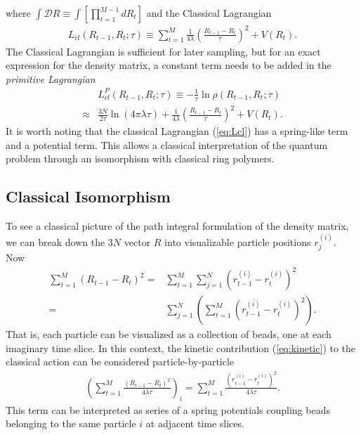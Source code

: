 \documentclass[prl,reprint]{revtex4-1}
\begin{document}
where $\int \mathcal{D}R\equiv \int[\prod_{t=1}^{M-1} dR_t]$ and the Classical Lagrangian~\cite{Ceperley_PIMC-review,Julich}
\begin{align}
L_{cl}(R_{t-1},R_t;\tau) \equiv \sum_{t=1}^M \frac{1}{4\lambda}\left(\frac{R_{t-1}-R_t}{\tau}\right)^2+V(R_t). \label{eq:Lcl}
\end{align}
The Classical Lagrangian is sufficient for later sampling, but for an exact expression for the density matrix, a constant term needs to be added in the \emph{primitive Lagrangian}
\begin{align}
&L^P_{cl}(R_{t-1},R_t;\tau)\equiv -\frac{1}{\tau}\ln\rho(R_{t-1},R_t;\tau) \nonumber \\
\approx&\frac{3N}{2\tau}\ln(4\pi\lambda\tau)+\frac{1}{4\lambda}\left(\frac{R_{t-1}-R_t}{\tau}\right)^2+V(R_t).
\end{align}
It is worth noting that the classical Lagrangian (\ref{eq:Lcl}) has a spring-like term and a potential term. This allows a classical interpretation of the quantum problem through an isomorphism with classical ring polymers.

\subsection{Classical Isomorphism}
To see a classical picture of the path integral formulation of the density matrix, we can break down the $3N$ vector $R$ into visualizable particle positions $r^{(i)}_j$.~\cite{Bernu_book} Now
\begin{align}
\sum_{t=1}^M (R_{t-1}-R_t)^2 =& \sum_{t=1}^M\sum_{j=1}^N (r^{(i)}_{t-1}-r^{(i)}_t)^2\nonumber \\
=&\sum_{j=1}^N\left(\sum_{t=1}^M (r^{(i)}_{t-1}-r^{(i)}_t)^2 \right).
\end{align}
That is, each particle can be visualized as a collection of beads, one at each imaginary time slice. In this context, the kinetic contribution (\ref{eq:kinetic}) to the classical action can be considered particle-by-particle
\begin{align}
\left(\sum_{t=1}^M\frac{(R_{t-1}-R_t)^2}{4\lambda\tau}\right)_i=\sum_{t=1}^M \frac{(r^{(i)}_{t-1}-r^{(i)}_t)^2}{4\lambda\tau}.
\end{align}
This term can be interpreted as series of a spring potentials coupling beads belonging to the same particle $i$ at adjacent time slices.
\end{document}
